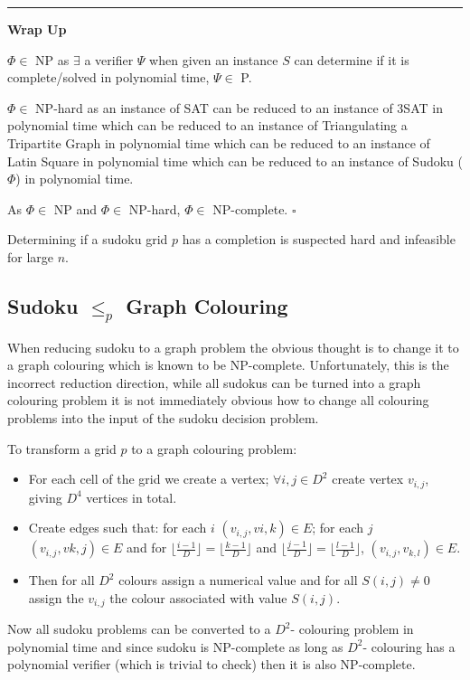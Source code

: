 \documentclass[a4paper,11pt]{report}
\newcounter{col}
\begin{document}
\noindent\rule{4cm}{0.4pt}

\textbf{Wrap Up} 

$\Phi\in $ NP as $\exists$ a verifier $\Psi$ when given an instance $S$ can determine if it is complete/solved in polynomial time, $\Psi\in$ P.

$\Phi\in $ NP-hard as an instance of SAT can be reduced to an instance of 3SAT in polynomial time which can be reduced to an instance of Triangulating a Tripartite Graph in polynomial time which can be reduced to an instance of Latin Square in polynomial time which can be reduced to an instance of Sudoku ($\Phi$) in polynomial time.

As $\Phi\in$ NP and $\Phi\in$ NP-hard, $\Phi\in$ NP-complete. $\square$

Determining if a sudoku grid $p$ has a completion is suspected hard and infeasible for large $n$.

\subsection{Sudoku $\leq_p$  Graph Colouring}

When reducing sudoku to a graph problem the obvious thought is to change it to a graph colouring which is known to be NP-complete. Unfortunately, this is the incorrect reduction direction, while all sudokus can be turned into a graph colouring problem it is not immediately obvious how to change all colouring problems into the input of the sudoku decision problem. 

To transform a grid $p$ to a graph colouring problem:
\begin{itemize}
\item For each cell of the grid we create a vertex; $\forall i,j\in D^2$ create vertex $v_{i,j}$, giving $D^4$ vertices in total.
\item Create edges such that: for each $i$ $(v_{i,j},v{i,k})\in E$; for each $j$ $(v_{i,j},v{k,j})\in E$ and for $\lfloor\frac{i-1}{D}\rfloor=\lfloor\frac{k-1}{D}\rfloor$ and $\lfloor\frac{j-1}{D}\rfloor=\lfloor\frac{l-1}{D}\rfloor$, $(v_{i,j},v_{k,l})\in E$.
\item Then for all $D^2$ colours assign a numerical value and for all $S(i,j)\neq 0$ assign the $v_{i,j}$ the colour associated with value $S(i,j)$.
\end{itemize}

Now all sudoku problems can be converted to a $D^2$- colouring problem in polynomial time and since sudoku is NP-complete as long as $D^2$- colouring has a polynomial verifier (which is trivial to check) then it is also NP-complete.  
\end{document}
